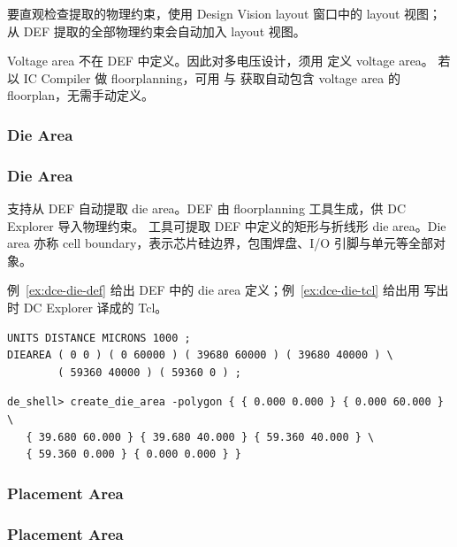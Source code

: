 要直观检查提取的物理约束，使用 Design Vision layout 窗口中的 layout 视图；从 DEF 提取的全部物理约束会自动加入 layout 视图。

\begin{noteBox}
Voltage area 不在 DEF 中定义。因此对多电压设计，须用  定义 voltage area。
若以 IC Compiler 做 floorplanning，可用  与  获取自动包含 voltage area 的 floorplan，无需手动定义。
\end{noteBox}

\subsubsection{Die Area}
\subsubsection*{Die Area}

 支持从 DEF 自动提取 die area。DEF 由 floorplanning 工具生成，供 DC Explorer 导入物理约束。
工具可提取 DEF 中定义的矩形与折线形 die area。Die area 亦称 cell boundary，表示芯片硅边界，包围焊盘、I/O 引脚与单元等全部对象。

例~\ref{ex:dce-die-def} 给出 DEF 中的 die area 定义；例~\ref{ex:dce-die-tcl} 给出用  写出时 DC Explorer 译成的 Tcl。

\begin{lstlisting}[caption={DEF 中的 Die Area 定义},label={ex:dce-die-def}]
UNITS DISTANCE MICRONS 1000 ;
DIEAREA ( 0 0 ) ( 0 60000 ) ( 39680 60000 ) ( 39680 40000 ) \
        ( 59360 40000 ) ( 59360 0 ) ;
\end{lstlisting}

\begin{lstlisting}[caption={写出物理约束时的等价 Tcl},label={ex:dce-die-tcl}]
de_shell> create_die_area -polygon { { 0.000 0.000 } { 0.000 60.000 } \
   { 39.680 60.000 } { 39.680 40.000 } { 59.360 40.000 } \
   { 59.360 0.000 } { 0.000 0.000 } }
\end{lstlisting}

\subsubsection{Placement Area}
\subsubsection*{Placement Area}

